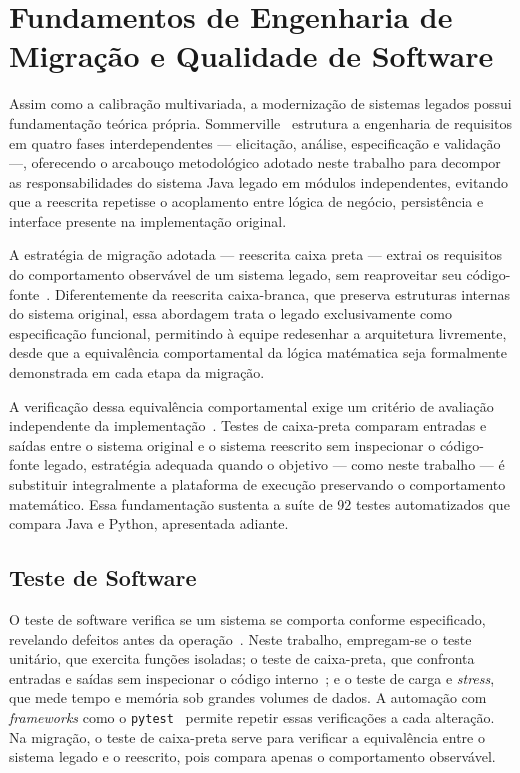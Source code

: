 \section{Fundamentos de Engenharia de Migração e Qualidade de Software}
\label{sec:fundengsw}

Assim como a calibração multivariada, a modernização de sistemas legados possui
fundamentação teórica própria. Sommerville~\cite{sommerville2011} estrutura a
engenharia de requisitos em quatro fases interdependentes --- elicitação, análise,
especificação e validação ---, oferecendo o arcabouço metodológico adotado neste
trabalho para decompor as responsabilidades do sistema Java legado em módulos
independentes, evitando que a reescrita repetisse o acoplamento entre lógica de
negócio, persistência e interface presente na implementação original.

A estratégia de migração adotada --- reescrita caixa preta --- extrai os
requisitos do comportamento observável de um sistema legado, sem reaproveitar seu
código-fonte~\cite{becker2020}. Diferentemente da reescrita caixa-branca, que
preserva estruturas internas do sistema original, essa abordagem trata o legado
exclusivamente como especificação funcional, permitindo à equipe redesenhar a
arquitetura livremente, desde que a equivalência comportamental da lógica
matématica seja formalmente demonstrada em cada etapa da migração.

A verificação dessa equivalência comportamental exige um critério de avaliação independente da implementação~\cite{pressman2016}. Testes de caixa-preta comparam entradas e saídas entre o sistema original e o sistema reescrito sem inspecionar o
código-fonte legado, estratégia adequada quando o objetivo --- como neste trabalho
--- é substituir integralmente a plataforma de execução preservando o comportamento
matemático. Essa fundamentação sustenta a suíte de 92 testes automatizados que
compara Java e Python, apresentada adiante.

\subsection{Teste de Software}
\label{sec:testesoftware}

O teste de software verifica se um sistema se comporta conforme especificado,
revelando defeitos antes da operação~\cite{pressman2016}. Neste trabalho,
empregam-se o teste unitário, que exercita funções isoladas; o teste de
caixa-preta, que confronta entradas e saídas sem inspecionar o código
interno~\cite{pressman2016,jorgensen2014}; e o teste de carga e
\textit{stress}, que mede tempo e memória sob grandes volumes de dados. A
automação com \textit{frameworks} como o \texttt{pytest}~\cite{pytest2024}
permite repetir essas verificações a cada alteração. Na migração, o teste de
caixa-preta serve para verificar a equivalência entre o sistema legado e o
reescrito, pois compara apenas o comportamento observável.